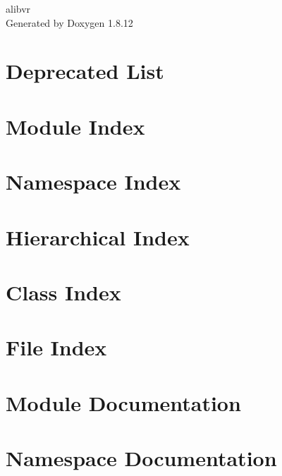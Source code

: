 \documentclass[twoside]{book}
\newcommand{\+}{\discretionary{\mbox{\scriptsize$\hookleftarrow$}}{}{}}
\newcommand{\clearemptydoublepage}{%
  \newpage{\pagestyle{empty}\cleardoublepage}%
}
\begin{document}
\hypersetup{pageanchor=false,
             bookmarksnumbered=true,
             pdfencoding=unicode
            }
\begin{titlepage}
\vspace*{7cm}
\begin{center}%
{\Large alibvr }\\
\vspace*{1cm}
{\large Generated by Doxygen 1.8.12}\\
\end{center}
\end{titlepage}
\clearemptydoublepage
{}
\tableofcontents
\clearemptydoublepage
{}
\hypersetup{pageanchor=true}

\chapter{Deprecated List}
\label{deprecated}
\hypertarget{deprecated}{}

\chapter{Module Index}

\chapter{Namespace Index}

\chapter{Hierarchical Index}

\chapter{Class Index}

\chapter{File Index}

\chapter{Module Documentation}

\chapter{Namespace Documentation}






\end{document}
